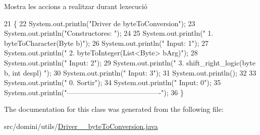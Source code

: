 Mostra les accions a realitzar durant l\textquotesingle{}execució 


\begin{DoxyCode}
21                                      \{
22         System.out.println(\textcolor{stringliteral}{"Driver de byteToConversion"});
23         System.out.println(\textcolor{stringliteral}{"Constructores: "});
24 
25         System.out.println(\textcolor{stringliteral}{"     1. byteToCharacter(Byte b)"});
26         System.out.println(\textcolor{stringliteral}{"     Input: 1"});
27         System.out.println(\textcolor{stringliteral}{"     2. byteToInteger(List<Byte> bArg)"});
28         System.out.println(\textcolor{stringliteral}{"     Input: 2"});
29         System.out.println(\textcolor{stringliteral}{"     3. shift\_right\_logic(byte b, int despl) "});
30         System.out.println(\textcolor{stringliteral}{"     Input: 3"});
31         System.out.println();
32 
33         System.out.println(\textcolor{stringliteral}{"     0. Sortir"});
34         System.out.println(\textcolor{stringliteral}{"     Input: 0"});
35         System.out.println(\textcolor{stringliteral}{"----------------------------------------"});
36     \}
\end{DoxyCode}


The documentation for this class was generated from the following file\+:\begin{DoxyCompactItemize}
\item 
src/domini/utils/\hyperlink{Driver____byteToConversion_8java}{Driver\+\_\+\+\_\+byte\+To\+Conversion.\+java}\end{DoxyCompactItemize}
